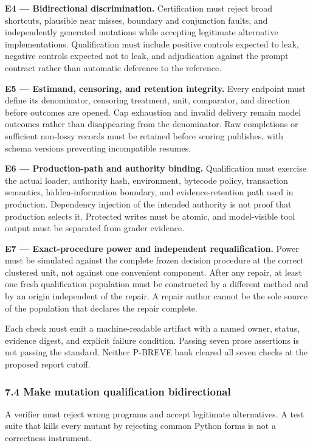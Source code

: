 \documentclass[
]{article}
\begin{document}
\textbf{E4 --- Bidirectional discrimination.} Certification must reject
broad shortcuts, plausible near misses, boundary and conjunction faults,
and independently generated mutations while accepting legitimate
alternative implementations. Qualification must include positive
controls expected to leak, negative controls expected not to leak, and
adjudication against the prompt contract rather than automatic deference
to the reference.

\textbf{E5 --- Estimand, censoring, and retention integrity.} Every
endpoint must define its denominator, censoring treatment, unit,
comparator, and direction before outcomes are opened. Cap exhaustion and
invalid delivery remain model outcomes rather than disappearing from the
denominator. Raw completions or sufficient non-lossy records must be
retained before scoring publishes, with schema versions preventing
incompatible resumes.

\textbf{E6 --- Production-path and authority binding.} Qualification
must exercise the actual loader, authority hash, environment, bytecode
policy, transaction semantics, hidden-information boundary, and
evidence-retention path used in production. Dependency injection of the
intended authority is not proof that production selects it. Protected
writes must be atomic, and model-visible tool output must be separated
from grader evidence.

\textbf{E7 --- Exact-procedure power and independent requalification.}
Power must be simulated against the complete frozen decision procedure
at the correct clustered unit, not against one convenient component.
After any repair, at least one fresh qualification population must be
constructed by a different method and by an origin independent of the
repair. A repair author cannot be the sole source of the population that
declares the repair complete.

Each check must emit a machine-readable artifact with a named owner,
status, evidence digest, and explicit failure condition. Passing seven
prose assertions is not passing the standard. Neither P-BREVE bank
cleared all seven checks at the proposed report cutoff.

\subsubsection{7.4 Make mutation qualification
bidirectional}\label{74-make-mutation-qualification-bidirectional}

A verifier must reject wrong programs and accept legitimate
alternatives. A test suite that kills every mutant by rejecting common
Python forms is not a correctness instrument.
\end{document}
